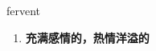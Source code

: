 
\begin{frame}
{\huge fervent}
\begin{center}
\begin{enumerate}\Large
  \item \textbf{充满感情的，热情洋溢的}
\end{enumerate}
\end{center}
\end{frame}
